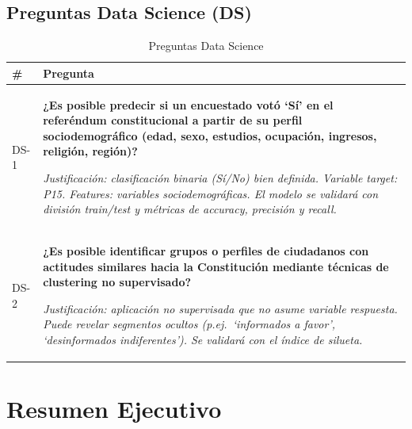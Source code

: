 \documentclass[12pt,a4paper]{article}
\newcommand{\thead}[1]{\cellcolor{tableheader}\color{white}\textbf{#1}}
\begin{document}
\subsection{Preguntas Data Science (DS)}


\begin{table}[H]
\centering
\renewcommand{\arraystretch}{1.8}
\begin{tabularx}{\linewidth}{p{0.8cm} X}
\toprule
\thead{\#} & \thead{Pregunta} \\
\midrule
DS-1
  & \textbf{¿Es posible predecir si un encuestado votó `Sí' en el referéndum constitucional a partir de su perfil sociodemográfico (edad, sexo, estudios, ocupación, ingresos, religión, región)?}

    \textit{\small Justificación: clasificación binaria (Sí/No) bien definida. Variable target: P15. Features: variables sociodemográficas. El modelo se validará con división train/test y métricas de accuracy, precisión y recall.} \\
\rowcolor{tablerow}
DS-2
  & \textbf{¿Es posible identificar grupos o perfiles de ciudadanos con actitudes similares hacia la Constitución mediante técnicas de clustering no supervisado?}

    \textit{\small Justificación: aplicación no supervisada que no asume variable respuesta. Puede revelar segmentos ocultos (p.ej.\ `informados a favor', `desinformados indiferentes'). Se validará con el índice de silueta.} \\
\bottomrule
\end{tabularx}
\caption{Preguntas Data Science}
\end{table}

\newpage

\section{Resumen Ejecutivo}
\end{document}
